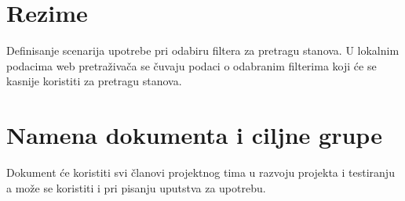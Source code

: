 \section{Rezime}
Definisanje scenarija upotrebe pri odabiru filtera za pretragu stanova. U lokalnim podacima web pretraživača se čuvaju podaci o odabranim filterima koji će se kasnije koristiti za pretragu stanova.
\section{Namena dokumenta i ciljne grupe}
Dokument će koristiti svi članovi projektnog tima u razvoju projekta i testiranju a može se koristiti i pri pisanju uputstva za upotrebu.